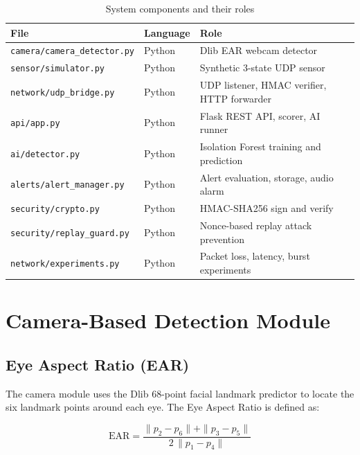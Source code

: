 \documentclass[12pt, a4paper]{article}
\begin{document}
\begin{table}[H]
\centering
\caption{System components and their roles}
\begin{tabularx}{\textwidth}{llX}
\toprule
\textbf{File} & \textbf{Language} & \textbf{Role} \\
\midrule
\texttt{camera/camera\_detector.py} & Python & Dlib EAR webcam detector \\
\texttt{sensor/simulator.py}        & Python & Synthetic 3-state UDP sensor \\
\texttt{network/udp\_bridge.py}     & Python & UDP listener, HMAC verifier, HTTP forwarder \\
\texttt{api/app.py}                 & Python & Flask REST API, scorer, AI runner \\
\texttt{ai/detector.py}             & Python & Isolation Forest training and prediction \\
\texttt{alerts/alert\_manager.py}   & Python & Alert evaluation, storage, audio alarm \\
\texttt{security/crypto.py}         & Python & HMAC-SHA256 sign and verify \\
\texttt{security/replay\_guard.py}  & Python & Nonce-based replay attack prevention \\
\texttt{network/experiments.py}     & Python & Packet loss, latency, burst experiments \\
\bottomrule
\end{tabularx}
\end{table}

\section{Camera-Based Detection Module}
\label{sec:camera}

\subsection{Eye Aspect Ratio (EAR)}

The camera module uses the Dlib 68-point facial landmark predictor to locate the
six landmark points around each eye. The Eye Aspect Ratio is defined as:

\begin{equation}
    \text{EAR} = \frac{\|p_2 - p_6\| + \|p_3 - p_5\|}{2\,\|p_1 - p_4\|}
\end{equation}
\end{document}
